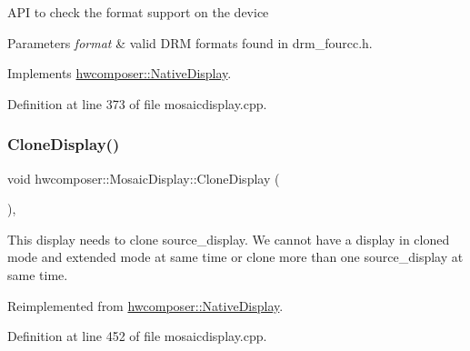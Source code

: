 A\+PI to check the format support on the device 
\begin{DoxyParams}{Parameters}
{\em format} & valid D\+RM formats found in drm\+\_\+fourcc.\+h. \\
\hline
\end{DoxyParams}


Implements \mbox{\hyperlink{classhwcomposer_1_1NativeDisplay_a4e856b5754054bdf77467e6663cb5b50}{hwcomposer\+::\+Native\+Display}}.



Definition at line 373 of file mosaicdisplay.\+cpp.


\begin{DoxyCode}{0}
\end{DoxyCode}
\mbox{\label{classhwcomposer_1_1MosaicDisplay_a7944dd71d1efa68e0f94f68cc1bd30b2}} 
\subsubsection{\texorpdfstring{Clone\+Display()}{CloneDisplay()}}
{\footnotesize\ttfamily void hwcomposer\+::\+Mosaic\+Display\+::\+Clone\+Display (\begin{DoxyParamCaption}\item[{\mbox{\hyperlink{classhwcomposer_1_1NativeDisplay}{Native\+Display}} $\ast$}]{ }\end{DoxyParamCaption})\hspace{0.3cm}{\ttfamily [override]}, {\ttfamily [virtual]}}

This display needs to clone source\+\_\+display. We cannot have a display in cloned mode and extended mode at same time or clone more than one source\+\_\+display at same time. 

Reimplemented from \mbox{\hyperlink{classhwcomposer_1_1NativeDisplay_ad244fa57c9c6380fb04bfd57da3cb28b}{hwcomposer\+::\+Native\+Display}}.



Definition at line 452 of file mosaicdisplay.\+cpp.


\begin{DoxyCode}{0}
\end{DoxyCode}
\mbox{\label{classhwcomposer_1_1MosaicDisplay_a9a53f36574c2ed39f589413721b0fafa}} 
